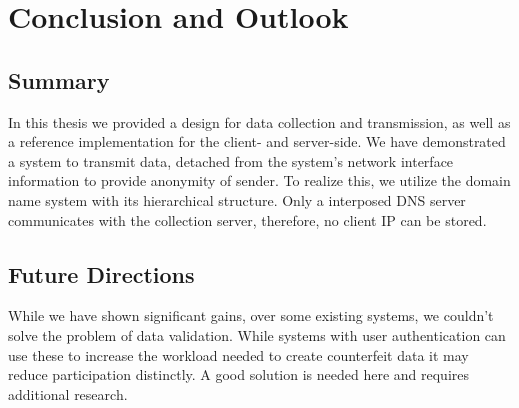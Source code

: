 \chapter{Conclusion and Outlook}
\label{chap:conclusion}

\section{Summary}
In this thesis we provided a design for data collection and transmission, as well as a reference implementation for the client- and server-side. We have demonstrated a system to transmit data, detached from the system's network interface information to provide anonymity of sender. 
To realize this, we utilize the domain name system with its hierarchical structure. Only a interposed DNS server communicates with the collection server, therefore, no client IP can be stored.\\


%


\section{Future Directions}

While we have shown significant gains, over some existing systems, we couldn't solve the problem of data validation. While systems with user authentication can use these to increase the workload needed to create counterfeit data it may reduce participation distinctly.
A good solution is needed here and requires additional research.


